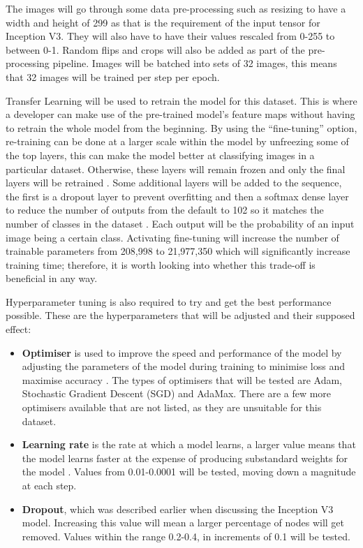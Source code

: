 \documentclass[12pt,a4paper]{report}
\begin{document}
The images will go through some data pre-processing such as resizing to have a width and height of 299 as that is the 
requirement of the input tensor for Inception V3. They will also have to have their values rescaled from 0-255 to 
between 0-1. Random flips and crops will also be added as part of the pre-processing pipeline. Images will be batched 
into sets of 32 images, this means that 32 images will be trained per step per epoch. 

\par

Transfer Learning will be used to retrain the model for this dataset. This is where a developer can make use of the
pre-trained model's feature maps without having to retrain the whole model from the beginning. By using the 
“fine-tuning” option, re-training can be done at a larger scale within the model by unfreezing some of the top layers, 
this can make the model better at classifying images in a particular dataset. Otherwise, these layers will 
remain frozen and only the final layers will be retrained \citep{transfer}. Some additional layers will be added to the 
sequence, the 
first is a dropout layer to prevent overfitting and then a softmax dense layer to reduce the number of outputs from the default 
to 102 so it matches the number of classes in the dataset \citep{denselayer}. Each output will be the probability of an 
input image being a
certain class. Activating fine-tuning will increase the number of trainable parameters from 208,998 to 21,977,350 which 
will significantly increase training time; therefore, it is worth looking into whether this trade-off is beneficial in 
any way.

\par

Hyperparameter tuning is also 
required to try and get the best performance possible. These are the hyperparameters that will be adjusted and
their supposed effect:

\begin{itemize}
    \item \textbf{Optimiser} is used to improve the speed and performance of the model by adjusting the parameters of the 
    model during training to minimise loss and maximise accuracy \citep{maithani}. The types of optimisers that will be
    tested are Adam, Stochastic Gradient Descent (SGD) and AdaMax. There are a few more optimisers 
    available that are not listed, as they are unsuitable for this dataset.
    \item \textbf{Learning rate} is the rate at which a model learns, a larger value means that the model learns faster 
    at the expense of producing substandard weights for the model \citep{andreaperlato}. Values from 0.01-0.0001 will
    be tested, moving down a magnitude at each step. 
    \item \textbf{Dropout}, which was described earlier when discussing the Inception V3 model. Increasing this value 
    will mean a larger percentage of nodes will get removed. Values within the range 0.2-0.4, in increments of 0.1 
    will be tested.
\end{itemize}
\end{document}

